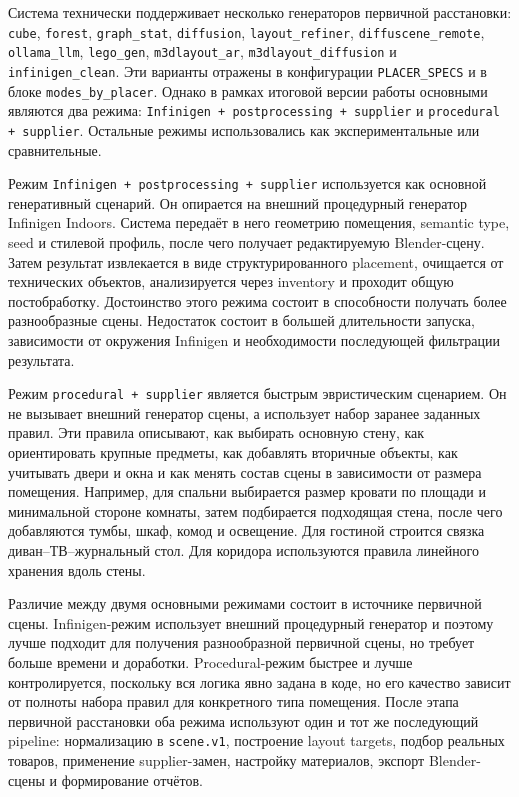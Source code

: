 \documentclass[times]{itmo-student-thesis}
\begin{document}
Система технически поддерживает несколько генераторов первичной расстановки: \texttt{cube}, \texttt{forest}, \texttt{graph\_stat}, \texttt{diffusion}, \texttt{layout\_refiner}, \texttt{diffuscene\_remote}, \texttt{ollama\_llm}, \texttt{lego\_gen}, \texttt{m3dlayout\_ar}, \texttt{m3dlayout\_diffusion} и \texttt{infinigen\_clean}. Эти варианты отражены в конфигурации \texttt{PLACER\_SPECS} и в блоке \texttt{modes\_by\_placer}. Однако в рамках итоговой версии работы основными являются два режима: \texttt{Infinigen + postprocessing + supplier} и \texttt{procedural + supplier}. Остальные режимы использовались как экспериментальные или сравнительные.

Режим \texttt{Infinigen + postprocessing + supplier} используется как основной генеративный сценарий. Он опирается на внешний процедурный генератор Infinigen Indoors. Система передаёт в него геометрию помещения, semantic type, seed и стилевой профиль, после чего получает редактируемую Blender-сцену. Затем результат извлекается в виде структурированного placement, очищается от технических объектов, анализируется через inventory и проходит общую постобработку. Достоинство этого режима состоит в способности получать более разнообразные сцены. Недостаток состоит в большей длительности запуска, зависимости от окружения Infinigen и необходимости последующей фильтрации результата.

Режим \texttt{procedural + supplier} является быстрым эвристическим сценарием. Он не вызывает внешний генератор сцены, а использует набор заранее заданных правил. Эти правила описывают, как выбирать основную стену, как ориентировать крупные предметы, как добавлять вторичные объекты, как учитывать двери и окна и как менять состав сцены в зависимости от размера помещения. Например, для спальни выбирается размер кровати по площади и минимальной стороне комнаты, затем подбирается подходящая стена, после чего добавляются тумбы, шкаф, комод и освещение. Для гостиной строится связка диван--ТВ--журнальный стол. Для коридора используются правила линейного хранения вдоль стены.

Различие между двумя основными режимами состоит в источнике первичной сцены. Infinigen-режим использует внешний процедурный генератор и поэтому лучше подходит для получения разнообразной первичной сцены, но требует больше времени и доработки. Procedural-режим быстрее и лучше контролируется, поскольку вся логика явно задана в коде, но его качество зависит от полноты набора правил для конкретного типа помещения. После этапа первичной расстановки оба режима используют один и тот же последующий pipeline: нормализацию в \texttt{scene.v1}, построение layout targets, подбор реальных товаров, применение supplier-замен, настройку материалов, экспорт Blender-сцены и формирование отчётов.
\end{document}
